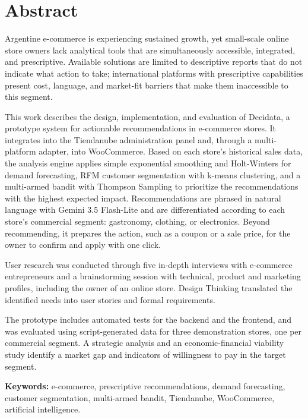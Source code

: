 \chapter*{Abstract}

Argentine e-commerce is experiencing sustained growth, yet small-scale online store owners lack analytical tools that are simultaneously accessible, integrated, and prescriptive. Available solutions are limited to descriptive reports that do not indicate what action to take; international platforms with prescriptive capabilities present cost, language, and market-fit barriers that make them inaccessible to this segment.

This work describes the design, implementation, and evaluation of Decidata, a prototype system for actionable recommendations in e-commerce stores. It integrates into the Tiendanube administration panel and, through a multi-platform adapter, into WooCommerce. Based on each store's historical sales data, the analysis engine applies simple exponential smoothing and Holt-Winters for demand forecasting, RFM customer segmentation with k-means clustering, and a multi-armed bandit with Thompson Sampling to prioritize the recommendations with the highest expected impact. Recommendations are phrased in natural language with Gemini 3.5 Flash-Lite and are differentiated according to each store's commercial segment: gastronomy, clothing, or electronics.
Beyond recommending, it prepares the action, such as a coupon or a sale price, for the owner to confirm and apply with one click.

User research was conducted through five in-depth interviews with e-commerce entrepreneurs and a brainstorming session with technical, product and marketing profiles, including the owner of an online store. Design Thinking translated the identified needs into user stories and formal requirements.

The prototype includes automated tests for the backend and the frontend, and was evaluated using script-generated data for three demonstration stores, one per commercial segment. A strategic analysis and an economic-financial viability study identify a market gap and indicators of willingness to pay in the target segment.

\bigskip
\noindent\textbf{Keywords:} e-commerce, prescriptive recommendations, demand forecasting, customer segmentation, multi-armed bandit, Tiendanube, WooCommerce, artificial intelligence.
